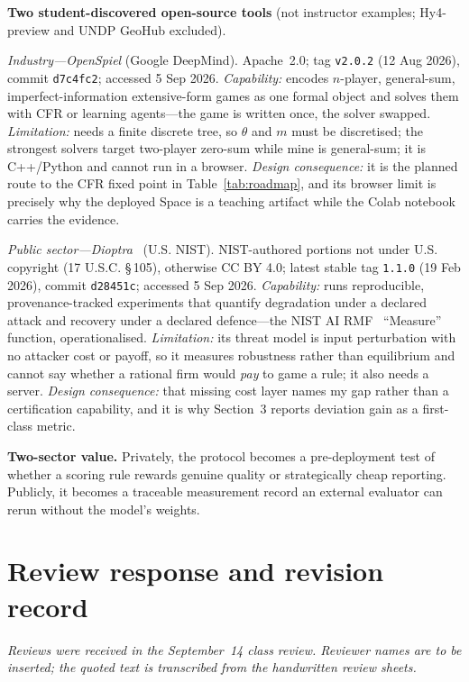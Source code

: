 \noindent\textbf{Two student-discovered open-source tools} (not instructor
examples; Hy4-preview and UNDP GeoHub excluded).

\noindent\emph{Industry---OpenSpiel} (Google DeepMind). Apache~2.0; tag
\texttt{v2.0.2} (12 Aug 2026), commit \texttt{d7c4fc2}; accessed 5 Sep 2026.
\emph{Capability:} encodes $n$-player, general-sum, imperfect-information
extensive-form games as one formal object and solves them with CFR or learning
agents---the game is written once, the solver swapped.
\emph{Limitation:} needs a finite discrete tree, so $\theta$ and $m$ must be
discretised; the strongest solvers target two-player zero-sum while mine is
general-sum; it is C++/Python and cannot run in a browser.
\emph{Design consequence:} it is the planned route to the CFR fixed point in
Table~\ref{tab:roadmap}, and its browser limit is precisely why the deployed
Space is a teaching artifact while the Colab notebook carries the evidence.

\noindent\emph{Public sector---Dioptra}~\cite{dioptra} (U.S. NIST). NIST-authored portions not
under U.S. copyright (17 U.S.C. \S\,105), otherwise CC BY 4.0; latest stable tag
\texttt{1.1.0} (19 Feb 2026), commit \texttt{d28451c}; accessed 5 Sep 2026.
\emph{Capability:} runs reproducible, provenance-tracked experiments that
quantify degradation under a declared attack and recovery under a declared
defence---the NIST AI RMF~\cite{nist2023} ``Measure'' function, operationalised.
\emph{Limitation:} its threat model is input perturbation with no attacker cost
or payoff, so it measures robustness rather than equilibrium and cannot say
whether a rational firm would \emph{pay} to game a rule; it also needs a server.
\emph{Design consequence:} that missing cost layer names my gap rather than a
certification capability, and it is why Section~3 reports deviation gain as a
first-class metric.

\noindent\textbf{Two-sector value.} Privately, the protocol becomes a
pre-deployment test of whether a scoring rule rewards genuine quality or
strategically cheap reporting. Publicly, it becomes a traceable measurement
record an external evaluator can rerun without the model's weights.

\clearpage
\section{Review response and revision record}
\emph{Reviews were received in the September~14 class review. Reviewer names are
to be inserted; the quoted text is transcribed from the handwritten review
sheets.}

